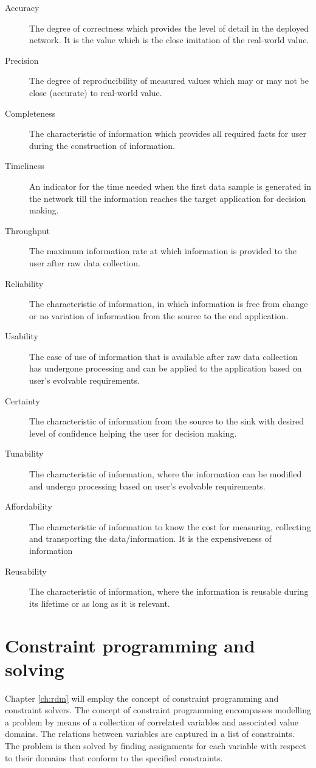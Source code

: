 \begin{description}
\nospace
\item[Accuracy] The degree of correctness which provides the level of detail in the deployed network. It is the value which is the close imitation of the real-world value.
\item[Precision] The degree of reproducibility of measured values which may or may not be close (accurate) to real-world value.
\item[Completeness] The characteristic of information which provides all required facts for user during the construction of information.
\item[Timeliness] An indicator for the time needed when the first data sample is generated in the network till the information reaches the target application for decision making.
\item[Throughput] The maximum information rate at which information is provided to the user after raw data collection.
\item[Reliability] The characteristic of information, in which information is free from change or no variation of information from the source to the end application.
\item[Usability] The ease of use of information that is available after raw data collection has undergone processing and can be applied to the application based on user's evolvable requirements.
\item[Certainty] The characteristic of information from the source to the sink with desired level of confidence helping the user for decision making.
\item[Tunability] The characteristic of information, where the information can be modified and undergo processing based on user's evolvable requirements.
\item[Affordability] The characteristic of information to know the cost for measuring, collecting and transporting the data/information. It is the expensiveness of information
\item[Reusability] The characteristic of information, where the information is reusable during its lifetime or as long as it is relevant.
\end{description}
\section{Constraint programming and solving}
\label{sec:back:constraint}
Chapter \ref{ch:rdm} will employ the concept of constraint programming and constraint solvers. The concept of constraint programming encompasses modelling a problem by means of a collection of correlated variables and associated value domains. The relations between variables are captured in a list of constraints. The problem is then solved by finding assignments for each variable with respect to their domains that conform to the specified constraints.

